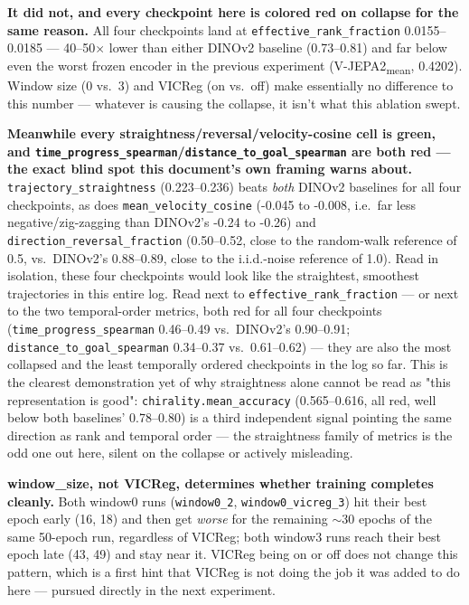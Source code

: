 \textbf{It did not, and every checkpoint here is colored red on collapse for the same
reason.} All four checkpoints land at \texttt{effective\_rank\_fraction}
0.0155--0.0185 --- 40--50$\times$ lower than either DINOv2 baseline (0.73--0.81) and
far below even the worst frozen encoder in the previous experiment
(V-JEPA2\textsubscript{mean}, 0.4202). Window size (0 vs.\ 3) and VICReg (on vs.\ off)
make essentially no difference to this number --- whatever is causing the collapse, it
isn't what this ablation swept.

\textbf{Meanwhile every straightness/reversal/velocity-cosine cell is green, and
\texttt{time\_progress\_spearman}/\texttt{distance\_to\_goal\_spearman} are both
red --- the exact blind spot this document's own framing warns about.}
\texttt{trajectory\_straightness} (0.223--0.236) beats \emph{both} DINOv2 baselines for
all four checkpoints, as does \texttt{mean\_velocity\_cosine} (-0.045 to -0.008, i.e.\
far less negative/zig-zagging than DINOv2's -0.24 to -0.26) and
\texttt{direction\_reversal\_fraction} (0.50--0.52, close to the random-walk reference of
0.5, vs.\ DINOv2's 0.88--0.89, close to the i.i.d.-noise reference of 1.0). Read in
isolation, these four checkpoints would look like the straightest, smoothest
trajectories in this entire log. Read next to \texttt{effective\_rank\_fraction} --- or
next to the two temporal-order metrics, both red for all four checkpoints
(\texttt{time\_progress\_spearman} 0.46--0.49 vs.\ DINOv2's 0.90--0.91;
\texttt{distance\_to\_goal\_spearman} 0.34--0.37 vs.\ 0.61--0.62) --- they are also the
most collapsed and the least temporally ordered checkpoints in the log so far. This is
the clearest demonstration yet of why straightness alone cannot be read as "this
representation is good": \texttt{chirality.mean\_accuracy} (0.565--0.616, all red, well
below both baselines' 0.78--0.80) is a third independent signal pointing the same
direction as rank and temporal order --- the straightness family of metrics is the odd
one out here, silent on the collapse or actively misleading.

\textbf{window\_size, not VICReg, determines whether training completes cleanly.} Both
window0 runs (\texttt{window0\_2}, \texttt{window0\_vicreg\_3}) hit their best epoch
early (16, 18) and then get \emph{worse} for the remaining $\sim$30 epochs of the same
50-epoch run, regardless of VICReg; both window3 runs reach their best epoch late (43,
49) and stay near it. VICReg being on or off does not change this pattern, which is a
first hint that VICReg is not doing the job it was added to do here --- pursued directly
in the next experiment.
